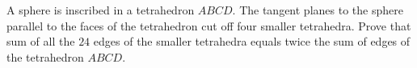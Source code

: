 A sphere is inscribed in a tetrahedron $ABCD$. The tangent planes to the sphere parallel to the faces of the tetrahedron cut off four smaller tetrahedra. Prove that sum of all the $24$ edges of the smaller tetrahedra equals twice the sum of edges of the tetrahedron $ABCD$.